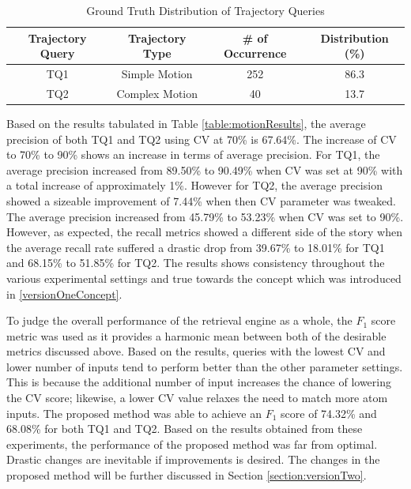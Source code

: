 \begin{table}[bht!]
\centering
\caption{Ground Truth Distribution of Trajectory Queries}
\label{table:motiondist}
\begin{tabular}{cccc}
\toprule
Trajectory Query &  Trajectory Type & \# of Occurrence & Distribution (\%)   \\
\midrule
TQ1       & Simple Motion       & 252 & 86.3   \\
TQ2      & Complex Motion       & 40 & 13.7  \\
\bottomrule
\end{tabular}
\end{table}

Based on the results tabulated in Table \ref{table:motionResults}, the average precision of both TQ1 and TQ2 using CV at 70\% is 67.64\%. The increase of CV to 70\% to 90\% shows an increase in terms of average precision. For TQ1, the average precision increased from 89.50\% to 90.49\% when CV was set at 90\% with a total increase of approximately 1\%. However for TQ2, the average precision showed a sizeable improvement of 7.44\% when then CV parameter was tweaked. The average precision increased from 45.79\% to 53.23\% when CV was set to 90\%.
However, as expected, the recall metrics showed a different side of the story when the average recall rate suffered a drastic drop from 39.67\% to 18.01\% for TQ1 and 68.15\% to 51.85\% for TQ2. The results shows consistency throughout the various experimental settings and true towards the concept which was introduced in \ref{versionOneConcept}.

To judge the overall performance of the retrieval engine as a whole, the $F_1$ score metric was used as it provides a harmonic mean between both of the desirable metrics discussed above. Based on the results, queries with the lowest CV and lower number of inputs tend to perform better than the other parameter settings.
This is because the additional number of input increases the chance of lowering the CV score; likewise, a lower CV value relaxes the need to match more atom inputs.
The proposed method was able to achieve an $F_1$ score of 74.32\% and 68.08\% for both TQ1 and TQ2.
Based on the results obtained from these experiments, the performance of the proposed method was far from optimal. Drastic changes are inevitable if improvements is desired. The changes in the proposed method will be further discussed in Section \ref{section:versionTwo}.


